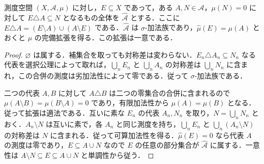 \begin{prop}[測度の完備化]
測度空間 $(X,\mathcal A,\mu)$ に対し，$E\subseteq X$ であって，ある $A,N\in\mathcal A$，$\mu(N)=0$ に対して $E\triangle A\subseteq N$ となるもの全体を $\widehat{\mathcal A}$ とする．ここに $E\triangle A=(E\setminus A)\cup(A\setminus E)$ である．$\widehat{\mathcal A}$ は $\sigma$-加法族であり，$\widehat\mu(E)=\mu(A)$ とおくと $\mu$ の完備拡張を得る．この拡張は一意である．
\end{prop}
\begin{proof}
$\varnothing$ は属する．補集合を取っても対称差は変わらない．$E_n\triangle A_n\subseteq N_n$ なる代表を選択公理によって取れば，$\bigcup_n E_n$ と $\bigcup_n A_n$ の対称差は $\bigcup_n N_n$ に含まれ，この合併の測度は劣加法性によって零である．従って $\sigma$-加法族である．

二つの代表 $A,B$ に対して $A\triangle B$ は二つの零集合の合併に含まれるので $\mu(A\setminus B)=\mu(B\setminus A)=0$ であり，有限加法性から $\mu(A)=\mu(B)$ となる．従って拡張は適法である．互いに素な $E_n$ の代表 $A_n,N_n$ を取り，$N=\bigcup_n N_n$ とおく．$A_n\setminus N$ は互いに素で，各 $A_n$ と同じ測度を持ち，$\bigcup_n E_n$ と $\bigcup_n(A_n\setminus N)$ の対称差は $N$ に含まれる．従って可算加法性を得る．$\widehat\mu(E)=0$ なら代表 $A$ の測度は零であり，$E\subseteq A\cup N$ なので $E$ の任意の部分集合が $\widehat{\mathcal A}$ に属する．一意性は $A\setminus N\subseteq E\subseteq A\cup N$ と単調性から従う．
\end{proof}
